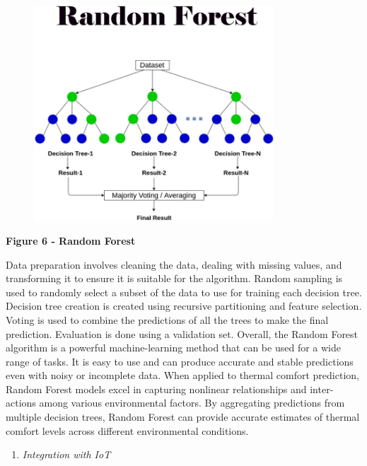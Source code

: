 \begin{figure}[H]
	\centering
	\includegraphics[width=0.8\textwidth]{media/ict/image22}
	\caption*{}
\end{figure}


{\bfseries Figure 6 - Random Forest}

Data preparation involves cleaning the data, dealing with missing
values, and transforming it to ensure it is suitable for the algorithm.
Random sampling is used to randomly select a subset of the data to use
for training each decision tree. Decision tree creation is created using
recursive partitioning and feature selection. Voting is used to combine
the predictions of all the trees to make the final prediction.
Evaluation is done using a validation set. Overall, the Random Forest
algorithm is a powerful machine-learning method that can be used for a
wide range of tasks. It is easy to use and can produce accurate and
stable predictions even with noisy or incomplete data. When applied to
thermal comfort prediction, Random Forest models excel in capturing
nonlinear relationships and inter- actions among various environmental
factors. By aggregating predictions from multiple decision trees, Random
Forest can provide accurate estimates of thermal comfort levels across
different environmental conditions.

\begin{enumerate}
\def\labelenumi{\Alph{enumi}.}
\setcounter{enumi}{7}
\item
  \emph{Integration with IoT}
\end{enumerate}


